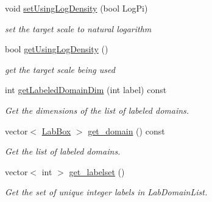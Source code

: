 \begin{DoxyCompactItemize}
void \hyperlink{classFobj_a809ddeff11d2485c9baef63217cf8ec5}{set\-Using\-Log\-Density} (bool \-Log\-Pi)
\begin{DoxyCompactList}\small\item\em set the target scale to natural logarithm \end{DoxyCompactList}\item 
bool \hyperlink{classFobj_add01053ad6d7c48fa088d6831e126d92}{get\-Using\-Log\-Density} ()
\begin{DoxyCompactList}\small\item\em get the target scale being used \end{DoxyCompactList}\item 
int \hyperlink{classFobj_add9a33b412a85fb11102eb4bd5998669}{get\-Labeled\-Domain\-Dim} (int label) const 
\begin{DoxyCompactList}\small\item\em \-Get the dimensions of the list of labeled domains. \end{DoxyCompactList}\item 
vector$<$ \hyperlink{classLabBox}{\-Lab\-Box} $>$ \hyperlink{classFobj_a69285b7966b3711d04dadf874ae6332a}{get\-\_\-domain} () const 
\begin{DoxyCompactList}\small\item\em \-Get the list of labeled domains. \end{DoxyCompactList}\item 
vector$<$ int $>$ \hyperlink{classFobj_aab479dd3bf44fa338cbab0991b783189}{get\-\_\-labelset} ()
\begin{DoxyCompactList}\small\item\em \-Get the set of unique integer labels in \-Lab\-Domain\-List. \end{DoxyCompactList}\end{DoxyCompactItemize}
